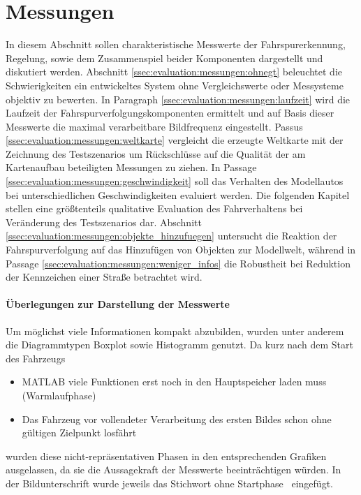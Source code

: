 \section{Messungen \dcsecondauthorshort}
In diesem Abschnitt sollen charakteristische Messwerte der Fahrspurerkennung, Regelung, sowie dem Zusammenspiel beider Komponenten dargestellt und diskutiert werden. 
Abschnitt \ref{ssec:evaluation:messungen:ohnegt} beleuchtet die Schwierigkeiten ein entwickeltes System ohne Vergleichswerte oder Messysteme objektiv zu bewerten. In Paragraph \ref{ssec:evaluation:messungen:laufzeit} wird die Laufzeit der Fahrspurverfolgungskomponenten ermittelt und auf Basis dieser Messwerte die maximal verarbeitbare Bildfrequenz eingestellt. Passus \ref{ssec:evaluation:messungen:weltkarte} vergleicht die erzeugte Weltkarte mit der Zeichnung des Testszenarios um Rückschlüsse auf die Qualität der am Kartenaufbau beteiligten Messungen zu ziehen. In Passage \ref{ssec:evaluation:messungen:geschwindigkeit} soll das Verhalten des Modellautos bei unterschiedlichen Geschwindigkeiten evaluiert werden. Die folgenden Kapitel stellen eine größtenteils qualitative Evaluation des Fahrverhaltens bei Veränderung des Testszenarios dar. Abschnitt \ref{ssec:evaluation:messungen:objekte_hinzufuegen} untersucht die Reaktion der Fahrspurverfolgung auf das Hinzufügen von Objekten zur Modellwelt, während in Passage \ref{ssec:evaluation:messungen:weniger_infos} die Robustheit bei Reduktion der Kennzeichen einer Straße betrachtet wird.

\paragraph{Überlegungen zur Darstellung der Messwerte}
Um möglichst viele Informationen kompakt abzubilden, wurden unter anderem die Diagrammtypen Boxplot sowie Histogramm genutzt. Da kurz nach dem Start des Fahrzeugs 
\begin{itemize}
	\item
	MATLAB viele Funktionen erst noch in den Hauptspeicher laden muss (\glqq Warmlaufphase\grqq)
	\item
	Das Fahrzeug vor vollendeter Verarbeitung des ersten Bildes schon ohne gültigen Zielpunkt losfährt
\end{itemize}
wurden diese nicht-repräsentativen Phasen in den entsprechenden Grafiken ausgelassen, da sie die Aussagekraft der Messwerte beeinträchtigen würden. In der Bildunterschrift wurde jeweils das Stichwort \glqq ohne Startphase \grqq\ eingefügt.
  
